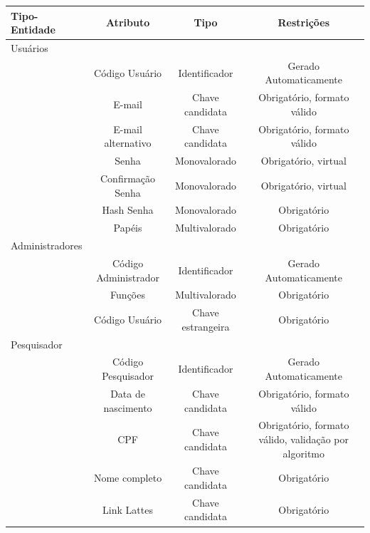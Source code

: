 \documentclass[11pt]{../../classes/ifscarticle}
\begin{document}
\begin{table}[h]
  \centering
  \vspace{0.5cm}
  \begin{tabular}{l|c|c|c|}
    Tipo-Entidade & Atributo & Tipo & Restrições \\ %
    \hline                               %
    Usuários \\
                  & Código Usuário      & Identificador     & Gerado Automaticamente      \\
                  & E-mail              & Chave candidata   & Obrigatório, formato válido \\
                  & E-mail alternativo  & Chave candidata   & Obrigatório, formato válido \\
                  & Senha               & Monovalorado      & Obrigatório, virtual        \\
                  & Confirmação Senha   & Monovalorado      & Obrigatório, virtual        \\
                  & Hash Senha          & Monovalorado      & Obrigatório                 \\
                  & Papéis              & Multivalorado     & Obrigatório                 \\
    \hline
    Administradores \\
                  & Código Administrador & Identificador & Gerado Automaticamente \\
                  & Funções              & Multivalorado & Obrigatório            \\
                  & Código Usuário      & Chave estrangeira & Obrigatório         \\
    \hline
    Pesquisador \\
                  & Código Pesquisador  & Identificador     & Gerado Automaticamente                               \\
                  & Data de nascimento  & Chave candidata   & Obrigatório, formato válido                          \\
                  & CPF                 & Chave candidata   & Obrigatório, formato válido, validação por algoritmo \\
                  & Nome completo       & Chave candidata   & Obrigatório                                          \\
                  & Link Lattes         & Chave candidata   & Obrigatório                                          \\

\end{tabular}
\end{table}
\end{document}
